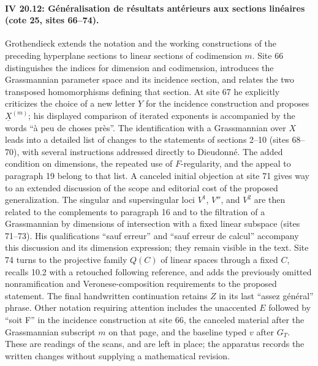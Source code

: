 \paragraph{IV 20.12: Généralisation de résultats antérieurs aux sections linéaires (cote 25, sites 66--74).}
Grothendieck extends the notation and the working constructions of the preceding hyperplane sections to linear sections of codimension $m$. Site 66 distinguishes the indices for dimension and codimension, introduces the Grassmannian parameter space and its incidence section, and relates the two transposed homomorphisms defining that section. At site 67 he explicitly criticizes the choice of a new letter $Y$ for the incidence construction and proposes $\underline{X}^{(m)}$; his displayed comparison of iterated exponents is accompanied by the words ``à peu de choses près''. The identification with a Grassmannian over $X$ leads into a detailed list of changes to the statements of sections 2--10 (sites 68--70), with several instructions addressed directly to Dieudonné. The added condition on dimensions, the repeated use of $F$-regularity, and the appeal to paragraph 19 belong to that list. A canceled initial objection at site 71 gives way to an extended discussion of the scope and editorial cost of the proposed generalization. The singular and supersingular loci $V^1$, $V''$, and $V^2$ are then related to the complements to paragraph 16 and to the filtration of a Grassmannian by dimensions of intersection with a fixed linear subspace (sites 71--73). His qualifications ``sauf erreur'' and ``sauf erreur de calcul'' accompany this discussion and its dimension expression; they remain visible in the text. Site 74 turns to the projective family $Q(C)$ of linear spaces through a fixed $C$, recalls 10.2 with a retouched following reference, and adds the previously omitted nonramification and Veronese-composition requirements to the proposed statement. The final handwritten continuation retains $Z$ in its last ``assez général'' phrase. Other notation requiring attention includes the unaccented $E$ followed by ``soit F'' in the incidence construction at site 66, the canceled material after the Grassmannian subscript $m$ on that page, and the baseline typed $v$ after $G_T$. These are readings of the scans, and are left in place; the apparatus records the written changes without supplying a mathematical revision.
